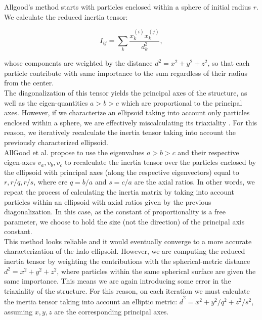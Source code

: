 Allgood's method starts with particles enclosed within a sphere of initial radius $r$. We calculate the reduced inertia tensor:

\begin{equation}
I_{ij} = \sum_k \frac{x_k^{(i)}x_k^{(j)}}{d^2_k},
\label{eq:inertia}
\end{equation}

whose components are weighted by the distance $d^2=x^2+y^2+z^2$, so that each particle contribute with same importance to the sum regardless of their radius from the center.\\

The diagonalization of this tensor yields the principal axes of the structure, as well as the eigen-quantities $a>b>c$ which are proportional to the principal axes. However, if we characterize an ellipsoid taking into account only particles enclosed within a sphere, we are effectively miscalculating its triaxiality \cite{Allgood_et_al._2006}. For this reason, we iteratively recalculate the inertia tensor taking into account the previously characterized ellipsoid.\\

AllGood et al. propose to use the eigenvalues $a>b>c$ and their respective eigen-axes $v_a,v_b,v_c$ to recalculate the inertia tensor over the particles enclosed by the ellipsoid with principal axes (along the respective eigenvectors) equal to $r,r/q,r/s$, where ere $q = b/a$ and $s=c/a$ are the axial ratios. In other words, we repeat the process of calculating the inertia matrix by taking into account particles within an ellipsoid with axial ratios given by the previous diagonalization. In this case, as the constant of proportionality is a free parameter, we choose to hold the size (not the direction) of the principal axis constant.\\

This method looks reliable and it would eventually converge to a more accurate characterization of the halo ellipsoid. However, we are computing the reduced inertia tensor by weighting the contributions with the spherical-metric distance $d^2=x^2+y^2+z^2$, where particles within the same spherical surface are given the same importance. This means we are again introducing some error in the triaxiality of the structure. For this reason, on each iteration we must calculate the inertia tensor taking into account an elliptic metric: $\bar{d}^2 = x^2+y^2/q^2+z^2/s^2$, assuming $x,y,z$ are the corresponding principal axes.\\

